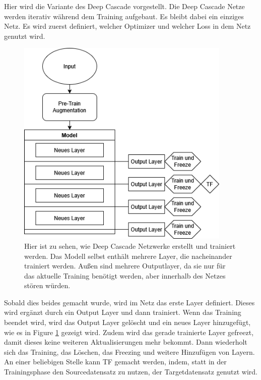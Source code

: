 Hier wird die Variante des Deep Cascade vorgestellt. 
Die Deep Cascade Netze werden iterativ während dem Training aufgebaut. Es bleibt dabei ein einziges Netz. Es wird zuerst 
definiert, welcher Optimizer und welcher Loss in dem Netz genutzt wird. 

\begin{figure}[htpb]
    \centering
    \includegraphics[height=10cm]{../../Graphiken/deepcascade_2.png}
    \caption{\label{fig:deepcascade} 
    \small{Hier ist zu sehen, wie Deep Cascade Netzwerke erstellt und trainiert werden. Das Modell selbst enthält mehrere Layer, 
    die nacheinander trainiert werden. Außen sind mehrere Outputlayer, da sie nur für das aktuelle Training benötigt werden, aber 
    innerhalb des Netzes stören würden.}}
\end{figure}

Sobald dies beides gemacht wurde, wird im Netz das erste Layer definiert. Dieses wird ergänzt durch ein Output Layer und dann trainiert. 
Wenn das Training beendet wird, wird das Output Layer gelöscht und ein neues Layer hinzugefügt, wie es in Figure \ref{fig:deepcascade} gezeigt wird. Zudem wird 
das gerade trainierte Layer gefreezt, damit dieses keine weiteren Aktualisierungen mehr bekommt. 
Dann wiederholt sich das Training, das Löschen, das Freezing und weitere Hinzufügen von Layern. 
An einer beliebigen Stelle kann TF gemacht werden, indem, statt in der Trainingsphase den Sourcedatensatz zu nutzen, der Targetdatensatz 
genutzt wird. 

